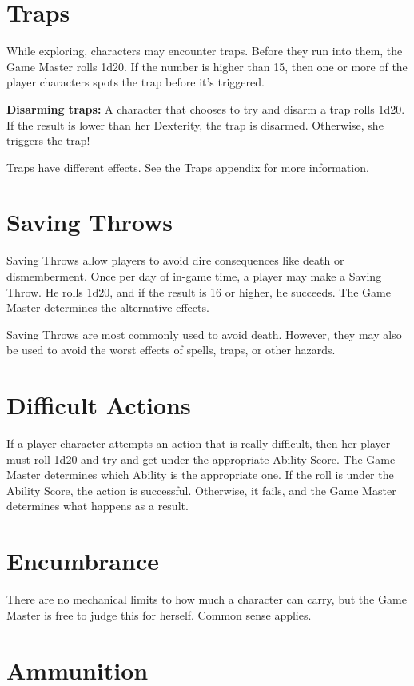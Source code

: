 \begin{multicols}{2}
\section{Traps}

While exploring, characters may encounter traps. Before they run into
them, the Game Master rolls 1d20. If the number is higher than 15, then
one or more of the player characters spots the trap before it's triggered.

\textbf{Disarming traps:} A character that chooses to try and disarm a trap
rolls 1d20. If the result is lower than her Dexterity, the trap is
disarmed. Otherwise, she triggers the trap!

Traps have different effects. See the Traps appendix for more information.

\section{Saving Throws}

Saving Throws allow players to avoid dire consequences like death or
dismemberment. Once per day of in-game time, a player may make a Saving
Throw. He rolls 1d20, and if the result is 16 or higher, he succeeds.
The Game Master determines the alternative effects.

Saving Throws are most commonly used to avoid death. However, they may
also be used to avoid the worst effects of spells, traps, or other
hazards.

\section{Difficult Actions}

If a player character attempts an action that is really difficult, then
her player must roll 1d20 and try and get under the appropriate Ability
Score. The Game Master determines which Ability is the appropriate one.
If the roll is under the Ability Score, the action is successful. Otherwise,
it fails, and the Game Master determines what happens as a result.

\section{Encumbrance}

There are no mechanical limits to how much a character can carry, but the
Game Master is free to judge this for herself. Common sense applies.

\section{Ammunition}


\end{multicols}
